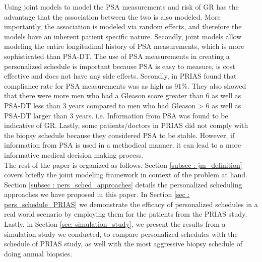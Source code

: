Using joint models to model the PSA measurements and risk of GR has the advantage that the association between the two is also modeled. More importantly, the association is modeled via random effects, and therefore the models have an inherent patient specific nature. Secondly, joint models allow modeling the entire longitudinal history of PSA measurements, which is more sophisticated than PSA-DT. The use of PSA measurements in creating a personalized schedule is important because PSA is easy to measure, is cost effective and does not have any side effects. Secondly, in PRIAS \cite{bokhorst2015compliance} found that compliance rate for PSA measurements was as high as 91\%. They also showed that there were more men who had a Gleason score greater than 6 as well as PSA-DT less than 3 years compared to men who had Gleason > 6 as well as PSA-DT larger than 3 years. i.e. Information from PSA was found to be indicative of GR. Lastly, some patients/doctors in PRIAS did not comply with the biopsy schedule because they considered PSA to be stable. However, if information from PSA is used in a methodical manner, it can lead to a more informative medical decision making process.\\

The rest of the paper is organized as follows. Section \ref{subsec : jm_definition} covers briefly the joint modeling framework in context of the problem at hand. Section \ref{subsec : pers_sched_approaches} details the personalized scheduling approaches we have proposed in this paper. In Section \ref{sec : pers_schedule_PRIAS} we demonstrate the efficacy of personalized schedules in a real world scenario by employing them for the patients from  the PRIAS study. Lastly, in Section \ref{sec: simulation_study}, we present the results from a simulation study we conducted, to compare personalized schedules with the schedule of PRIAS study, as well with the most aggressive biopsy schedule of doing annual biopsies.
